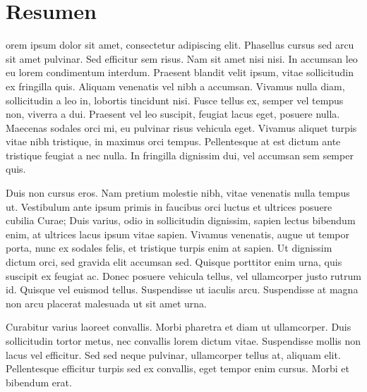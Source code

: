 \chapter*{Resumen}
{
\setlength{\parskip}{1em}
orem ipsum dolor sit amet, consectetur adipiscing elit. Phasellus cursus sed arcu sit amet pulvinar. Sed efficitur sem risus. Nam sit amet nisi nisi. In accumsan leo eu lorem condimentum interdum. Praesent blandit velit ipsum, vitae sollicitudin ex fringilla quis. Aliquam venenatis vel nibh a accumsan. Vivamus nulla diam, sollicitudin a leo in, lobortis tincidunt nisi. Fusce tellus ex, semper vel tempus non, viverra a dui. Praesent vel leo suscipit, feugiat lacus eget, posuere nulla. Maecenas sodales orci mi, eu pulvinar risus vehicula eget. Vivamus aliquet turpis vitae nibh tristique, in maximus orci tempus. Pellentesque at est dictum ante tristique feugiat a nec nulla. In fringilla dignissim dui, vel accumsan sem semper quis.

Duis non cursus eros. Nam pretium molestie nibh, vitae venenatis nulla tempus ut. Vestibulum ante ipsum primis in faucibus orci luctus et ultrices posuere cubilia Curae; Duis varius, odio in sollicitudin dignissim, sapien lectus bibendum enim, at ultrices lacus ipsum vitae sapien. Vivamus venenatis, augue ut tempor porta, nunc ex sodales felis, et tristique turpis enim at sapien. Ut dignissim dictum orci, sed gravida elit accumsan sed. Quisque porttitor enim urna, quis suscipit ex feugiat ac. Donec posuere vehicula tellus, vel ullamcorper justo rutrum id. Quisque vel euismod tellus. Suspendisse ut iaculis arcu. Suspendisse at magna non arcu placerat malesuada ut sit amet urna.

Curabitur varius laoreet convallis. Morbi pharetra et diam ut ullamcorper. Duis sollicitudin tortor metus, nec convallis lorem dictum vitae. Suspendisse mollis non lacus vel efficitur. Sed sed neque pulvinar, ullamcorper tellus at, aliquam elit. Pellentesque efficitur turpis sed ex convallis, eget tempor enim cursus. Morbi et bibendum erat.

}
\clearpage